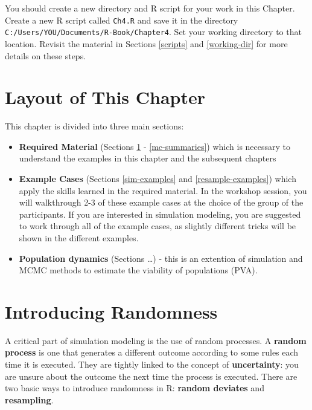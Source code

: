 \documentclass[]{book}
\begin{document}
You should create a new directory and R script for your work in this Chapter. Create a new R script called \texttt{Ch4.R} and save it in the directory \texttt{C:/Users/YOU/Documents/R-Book/Chapter4}. Set your working directory to that location. Revisit the material in Sections \ref{scripts} and \ref{working-dir} for more details on these steps.

\hypertarget{layout-of-this-chapter}{%
\section*{Layout of This Chapter}\label{layout-of-this-chapter}}

This chapter is divided into three main sections:

\begin{itemize}
\item
  \textbf{Required Material} (Sections \ref{randomness} - \ref{mc-summaries}) which is necessary to understand the examples in this chapter and the subsequent chapters
\item
  \textbf{Example Cases} (Sections \ref{sim-examples} and \ref{resample-examples}) which apply the skills learned in the required material. In the workshop session, you will walkthrough 2-3 of these example cases at the choice of the group of the participants. If you are interested in simulation modeling, you are suggested to work through all of the example cases, as slightly different tricks will be shown in the different examples.
\item
  \textbf{Population dynamics} (Sections \ldots) - this is an extention of simulation and MCMC methods to estimate the viability of populations (PVA).
\end{itemize}

\hypertarget{randomness}{%
\section{Introducing Randomness}\label{randomness}}

A critical part of simulation modeling is the use of random processes. A \textbf{random process} is one that generates a different outcome according to some rules each time it is executed. They are tightly linked to the concept of \textbf{uncertainty}: you are unsure about the outcome the next time the process is executed. There are two basic ways to introduce randomness in R: \textbf{random deviates} and \textbf{resampling}.
\end{document}

